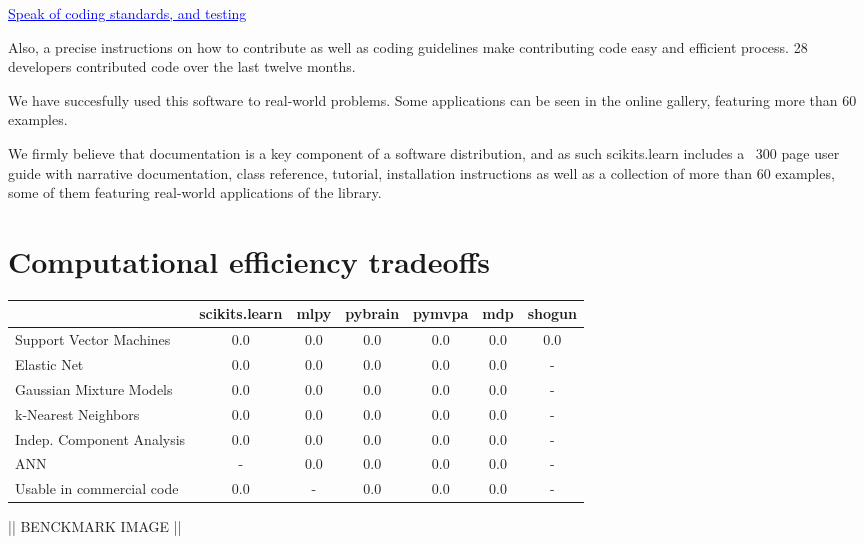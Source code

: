\documentclass[twoside,11pt]{article}
\newcommand{\GAEL}[1]{\textcolor{blue}{\uline{#1}}}
\begin{document}
\GAEL{Speak of coding standards, and testing} 

Also, a precise instructions on how to contribute as well as coding
guidelines make contributing code easy and efficient process. 28
developers contributed code over the last twelve months.

We have succesfully used this software to real-world problems. Some
applications can be seen in the online gallery, featuring more than 60
examples.


We firmly believe that documentation is a key component of a software
distribution, and as such scikits.learn includes a ~300 page user
guide with narrative documentation, class reference, tutorial,
installation instructions as well as a collection of more than 60
examples, some of them featuring real-world applications of the
library.


\section{Computational efficiency tradeoffs}


\begin{center}


\begin{tabular}{l c c c c c c}
\hline\hline %
 & scikits.learn & mlpy & pybrain & pymvpa &  mdp & shogun \\ [0.5ex]
\hline
Support Vector Machines        & 0.0 & 0.0   & 0.0       &  0.0     & 0.0    & 0.0 \\
Elastic Net & 0.0 & 0.0   & 0.0       &  0.0     & 0.0    & - \\
Gaussian Mixture Models  & 0.0 & 0.0   & 0.0       &  0.0     & 0.0    & - \\
k-Nearest Neighbors & 0.0 & 0.0   & 0.0       &  0.0     & 0.0    & - \\
Indep. Component Analysis & 0.0 & 0.0  & 0.0  & 0.0  & 0.0  & - \\
ANN  & - & 0.0  & 0.0  & 0.0  & 0.0  & - \\
Usable in commercial code &  0.0 & -   & 0.0       &  0.0     & 0.0    & - \\
\hline
\end{tabular}

\end{center}

|| BENCKMARK IMAGE ||
\end{document}
